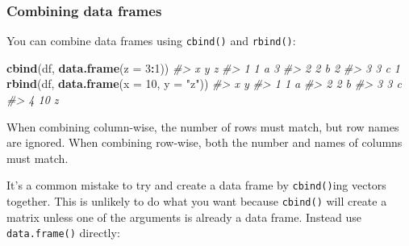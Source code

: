 \documentclass[]{book}
\newenvironment{Shaded}{\begin{snugshade}}{\end{snugshade}}
\newcommand{\CommentTok}[1]{\textcolor[rgb]{0.56,0.35,0.01}{\textit{#1}}}
\newcommand{\DataTypeTok}[1]{\textcolor[rgb]{0.13,0.29,0.53}{#1}}
\newcommand{\DecValTok}[1]{\textcolor[rgb]{0.00,0.00,0.81}{#1}}
\newcommand{\KeywordTok}[1]{\textcolor[rgb]{0.13,0.29,0.53}{\textbf{#1}}}
\newcommand{\NormalTok}[1]{#1}
\newcommand{\OperatorTok}[1]{\textcolor[rgb]{0.81,0.36,0.00}{\textbf{#1}}}
\newcommand{\StringTok}[1]{\textcolor[rgb]{0.31,0.60,0.02}{#1}}
\theoremstyle{definition}
\theoremstyle{definition}
\theoremstyle{definition}
\theoremstyle{remark}
\begin{document}
\hypertarget{combining-data-frames}{%
\subsubsection{Combining data frames}\label{combining-data-frames}}

You can combine data frames using \texttt{cbind()} and \texttt{rbind()}:

\begin{Shaded}
\begin{Highlighting}[]
\KeywordTok{cbind}\NormalTok{(df, }\KeywordTok{data.frame}\NormalTok{(}\DataTypeTok{z =} \DecValTok{3}\OperatorTok{:}\DecValTok{1}\NormalTok{))}
\CommentTok{#>   x y z}
\CommentTok{#> 1 1 a 3}
\CommentTok{#> 2 2 b 2}
\CommentTok{#> 3 3 c 1}
\KeywordTok{rbind}\NormalTok{(df, }\KeywordTok{data.frame}\NormalTok{(}\DataTypeTok{x =} \DecValTok{10}\NormalTok{, }\DataTypeTok{y =} \StringTok{"z"}\NormalTok{))}
\CommentTok{#>    x y}
\CommentTok{#> 1  1 a}
\CommentTok{#> 2  2 b}
\CommentTok{#> 3  3 c}
\CommentTok{#> 4 10 z}
\end{Highlighting}
\end{Shaded}

When combining column-wise, the number of rows must match, but row names
are ignored. When combining row-wise, both the number and names of
columns must match.

It's a common mistake to try and create a data frame by
\texttt{cbind()}ing vectors together. This is unlikely to do what you
want because \texttt{cbind()} will create a matrix unless one of the
arguments is already a data frame. Instead use \texttt{data.frame()}
directly:

\begin{Shaded}
\end{Shaded}
\end{document}
